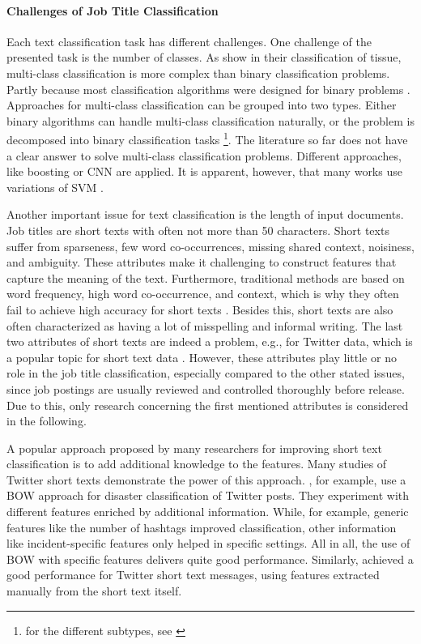 \documentclass[12pt, a4paper, titlepage]{article}
\begin{document}
\paragraph{Challenges of Job Title Classification}
Each text classification task has different challenges. One challenge of the presented task is the number of classes. As \cite{li2004} show in their classification of tissue, multi-class classification is more complex than binary classification problems. Partly because most classification algorithms were designed for binary problems \citep{aly2005}. Approaches for multi-class classification can be grouped into two types. Either binary algorithms can handle multi-class classification naturally, or the problem is decomposed into binary classification tasks \footnote{for the different subtypes, see \cite{aly2005}}. The literature so far does not have a clear answer to solve multi-class classification problems. Different approaches, like boosting \citep{schapire2000} or \ac{CNN} \citep{farooq2017} are applied. It is apparent, however, that many works use variations of \ac{SVM} \citep{guo2015, tomar2015comparison, Tang2019}.  

Another important issue for text classification is the length of input documents. Job titles are short texts with often not more than 50 characters. Short texts suffer from sparseness, few word co-occurrences, missing shared context, noisiness, and ambiguity. These attributes make it challenging to construct features that capture the meaning of the text. Furthermore, traditional methods are based on word frequency, high word co-occurrence, and context, which is why they often fail to achieve high accuracy for short texts \citep{Song2014, WangY2017, WangF2014,  alsmadi2019}. Besides this, short texts are also often characterized as having a lot of misspelling and informal writing. The last two attributes of short texts are indeed a problem, e.g., for Twitter data, which is a popular topic for short text data \citep{karimi2013, sriram2010, yan2018}. However, these attributes play little or no role in the job title classification, especially compared to the other stated issues, since job postings are usually reviewed and controlled thoroughly before release. Due to this, only research concerning the first mentioned attributes is considered in the following. 

A popular approach proposed by many researchers for improving short text classification is to add additional knowledge to the features. Many studies of Twitter short texts demonstrate the power of this approach. \citet{karimi2013}, for example, use a \ac{BOW} approach for disaster classification of Twitter posts. They experiment with different features enriched by additional information. While, for example, generic features like the number of hashtags improved classification, other information like incident-specific features only helped in specific settings. All in all, the use of \ac{BOW} with specific features delivers quite good performance. Similarly, \citet{sriram2010} achieved a good performance for Twitter short text messages, using features extracted manually from the short text itself.
\end{document}
